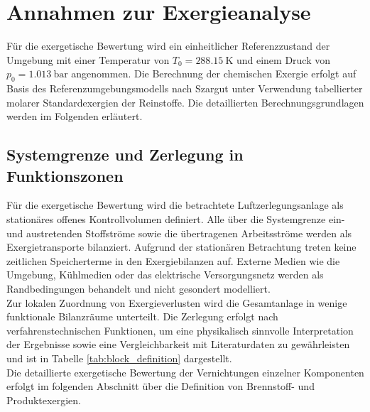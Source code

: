 \section{Annahmen zur Exergieanalyse}
\label{sec:modell_basic_assumptions_exergie}

Für die exergetische Bewertung wird ein einheitlicher Referenzzustand der Umgebung mit einer Temperatur von  \(T_0 = \SI{288,15}{\kelvin}\) und einem Druck von \(p_0 = \SI{1,013}{\bar}\) angenommen. Die Berechnung der chemischen Exergie erfolgt auf Basis des Referenzumgebungsmodells nach Szargut unter Verwendung tabellierter molarer Standardexergien der Reinstoffe. Die
detaillierten Berechnungsgrundlagen werden im Folgenden erläutert.

\subsection{Systemgrenze und Zerlegung in Funktionszonen}
\label{sec:modell_System_funktion}

Für die exergetische Bewertung wird die betrachtete Luftzerlegungsanlage als
stationäres offenes Kontrollvolumen definiert. Alle über die Systemgrenze ein-
und austretenden Stoffströme sowie die übertragenen Arbeitsströme werden als
Exergietransporte bilanziert. Aufgrund der stationären Betrachtung treten keine
zeitlichen Speicherterme in den Exergiebilanzen auf. Externe Medien wie die
Umgebung, Kühlmedien oder das elektrische Versorgungsnetz werden als
Randbedingungen behandelt und nicht gesondert modelliert.\\
Zur lokalen Zuordnung von Exergieverlusten wird die Gesamtanlage in wenige funktionale Bilanzräume unterteilt. Die Zerlegung erfolgt nach verfahrenstechnischen Funktionen, um eine physikalisch sinnvolle Interpretation der Ergebnisse sowie eine Vergleichbarkeit mit Literaturdaten zu gewährleisten und ist in Tabelle \ref{tab:block_definition} dargestellt.\\
Die detaillierte exergetische Bewertung der Vernichtungen einzelner Komponenten erfolgt im folgenden Abschnitt über die Definition von Brennstoff- und Produktexergien.

